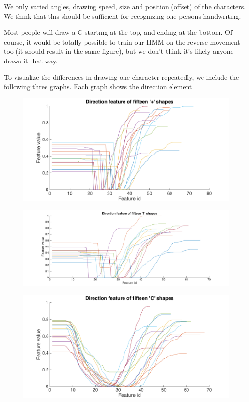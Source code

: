 We only varied angles, drawing speed, size and position (offset) of the characters. We think that this should be sufficient for recognizing one persons handwriting.

Most people will draw a C starting at the top, and ending at the bottom. Of course, it would be totally possible to train our HMM on the reverse movement too (it should result in the same figure), but we don't think it's likely anyone draws it that way.

To visualize the differences in drawing one character repeatedly, we include the following three graphs. Each graph shows the direction element 

\begin{figure}[H]
	\centering
	\includegraphics[width=.95\linewidth]{images/direction_plots_+}
\end{figure}

\begin{figure}[H]
	\centering
	\includegraphics[width=.95\linewidth]{images/direction_plots_T}
\end{figure}

\begin{figure}[H]
	\centering
	\includegraphics[width=.95\linewidth]{images/direction_plots_C}
\end{figure}